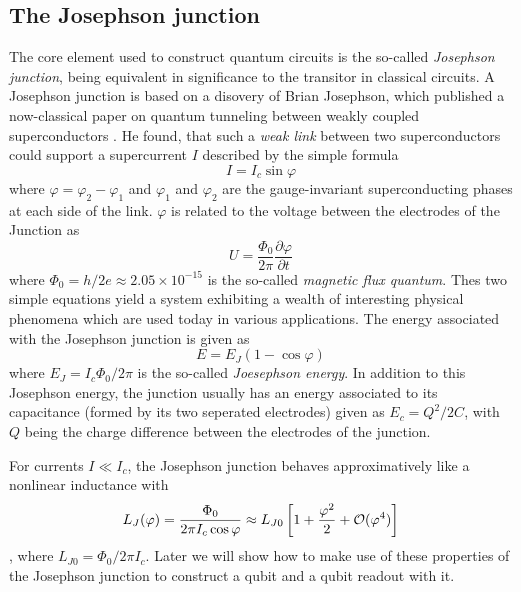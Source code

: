\subsection{The Josephson junction}

The core element used to construct quantum circuits is the so-called {\it Josephson junction}, being equivalent in significance to the transitor in classical circuits. A Josephson junction is based on a disovery of Brian Josephson, which published a now-classical paper on quantum tunneling between weakly coupled superconductors \citep{josephson_possible_1962}. He found, that such a {\it weak link} between two superconductors could support a supercurrent $I$ described by the simple formula
%
\begin{equation}
I = I_c\sin{\varphi}
\end{equation}
%
where $\varphi = \varphi_2-\varphi_1$ and $\varphi_1$ and $\varphi_2$ are the gauge-invariant superconducting phases at each side of the link. $\varphi$ is related to the voltage between the electrodes of the Junction as
%
\begin{equation}
U = \frac{\Phi_0}{2\pi}\frac{\partial \varphi}{\partial t}
\end{equation}
%
where $\Phi_0 =h/2e \approx 2.05\times 10^{-15}$ is the so-called {\it magnetic flux quantum}. Thes two simple equations yield a system exhibiting a  wealth of interesting physical phenomena which are used today in various applications. The energy associated with the Josephson junction is given as
%
\begin{equation}
E = E_J(1-\cos{\varphi})
\end{equation}
%
where $E_J = I_c \Phi_0/2\pi$ is the so-called {\it Joesephson energy}. In addition to this Josephson energy, the junction usually has an energy associated to its capacitance (formed by its two seperated electrodes) given as $E_c = Q^2/2C$, with $Q$ being the charge difference between the electrodes of the junction.

\smallskip

For currents $I\ll I_c$, the Josephson junction behaves approximatively like a nonlinear inductance with
%
\begin{equation}
L_J(\varphi) = \frac{\Phi_0}{2\pi I_c \cos{\varphi}} \approx L_{J0}\left[1+\frac{\varphi^2}{2}+\begin{mathcal}O\end{mathcal}(\varphi^4)\right]\label{eq:josephson_inductance}
\end{equation}
%
, where $L_{J0}=\Phi_0/2\pi I_c$. Later we will show how to make use of these properties of the Josephson junction to construct a qubit and a qubit readout with it.

